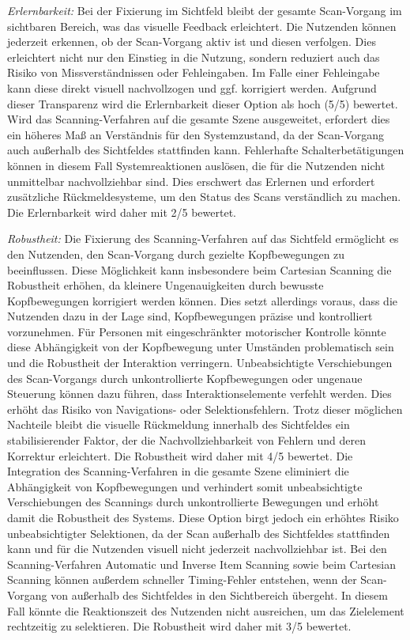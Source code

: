 \textit{Erlernbarkeit:} 
Bei der Fixierung im Sichtfeld bleibt der gesamte Scan-Vorgang im sichtbaren Bereich, was das visuelle Feedback erleichtert. Die Nutzenden können jederzeit erkennen, ob der Scan-Vorgang aktiv ist und diesen verfolgen. Dies erleichtert nicht nur den Einstieg in die Nutzung, sondern reduziert auch das Risiko von Missverständnissen oder Fehleingaben. Im Falle einer Fehleingabe kann diese direkt visuell nachvollzogen und ggf. korrigiert werden. Aufgrund dieser Transparenz wird die Erlernbarkeit dieser Option als hoch (5/5) bewertet.
Wird das Scanning-Verfahren auf die gesamte Szene ausgeweitet, erfordert dies ein höheres Maß an Verständnis für den Systemzustand, da der Scan-Vorgang auch außerhalb des Sichtfeldes stattfinden kann. Fehlerhafte Schalterbetätigungen können in diesem Fall Systemreaktionen auslösen, die für die Nutzenden nicht unmittelbar nachvollziehbar sind. Dies erschwert das Erlernen und erfordert zusätzliche Rückmeldesysteme, um den Status des Scans verständlich zu machen. Die Erlernbarkeit wird daher mit 2/5 bewertet. 

\textit{Robustheit:}
Die Fixierung des Scanning-Verfahren auf das Sichtfeld ermöglicht es den Nutzenden, den Scan-Vorgang durch gezielte Kopfbewegungen zu beeinflussen. Diese Möglichkeit kann insbesondere beim Cartesian Scanning die Robustheit erhöhen, da kleinere Ungenauigkeiten durch bewusste Kopfbewegungen korrigiert werden können. Dies setzt allerdings voraus, dass die Nutzenden dazu in der Lage sind, Kopfbewegungen präzise und kontrolliert vorzunehmen. Für Personen mit eingeschränkter motorischer Kontrolle könnte diese Abhängigkeit von der Kopfbewegung unter Umständen problematisch sein und die Robustheit der Interaktion verringern. Unbeabsichtigte Verschiebungen des Scan-Vorgangs durch unkontrollierte Kopfbewegungen oder ungenaue Steuerung können dazu führen, dass Interaktionselemente verfehlt werden. Dies erhöht das Risiko von Navigations- oder Selektionsfehlern. Trotz dieser möglichen Nachteile bleibt die visuelle Rückmeldung innerhalb des Sichtfeldes ein stabilisierender Faktor, der die Nachvollziehbarkeit von Fehlern und deren Korrektur erleichtert. Die Robustheit wird daher mit 4/5 bewertet. 
Die Integration des Scanning-Verfahren in die gesamte Szene eliminiert die Abhängigkeit von Kopfbewegungen und verhindert somit unbeabsichtigte Verschiebungen des Scannings durch unkontrollierte Bewegungen und erhöht damit die Robustheit des Systems. Diese Option birgt jedoch ein erhöhtes Risiko unbeabsichtigter Selektionen, da der Scan außerhalb des Sichtfeldes stattfinden kann und für die Nutzenden visuell nicht jederzeit nachvollziehbar ist. Bei den Scanning-Verfahren Automatic und Inverse Item Scanning sowie beim Cartesian Scanning können außerdem schneller Timing-Fehler entstehen, wenn der Scan-Vorgang von außerhalb des Sichtfeldes in den Sichtbereich übergeht. In diesem Fall könnte die Reaktionszeit des Nutzenden nicht ausreichen, um das Zielelement rechtzeitig zu selektieren. Die Robustheit wird daher mit 3/5 bewertet. 

